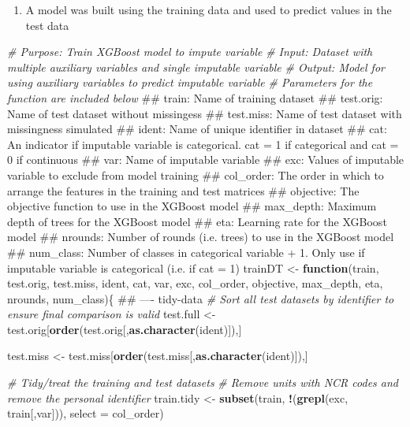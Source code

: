 \documentclass[]{book}
\newenvironment{Shaded}{\begin{snugshade}}{\end{snugshade}}
\newcommand{\KeywordTok}[1]{\textcolor[rgb]{0.13,0.29,0.53}{\textbf{#1}}}
\newcommand{\DataTypeTok}[1]{\textcolor[rgb]{0.13,0.29,0.53}{#1}}
\newcommand{\StringTok}[1]{\textcolor[rgb]{0.31,0.60,0.02}{#1}}
\newcommand{\CommentTok}[1]{\textcolor[rgb]{0.56,0.35,0.01}{\textit{#1}}}
\newcommand{\ControlFlowTok}[1]{\textcolor[rgb]{0.13,0.29,0.53}{\textbf{#1}}}
\newcommand{\OperatorTok}[1]{\textcolor[rgb]{0.81,0.36,0.00}{\textbf{#1}}}
\newcommand{\NormalTok}[1]{#1}
\providecommand{\tightlist}{%
  \setlength{\itemsep}{0pt}\setlength{\parskip}{0pt}}
\begin{document}
\begin{enumerate}
\def\labelenumi{\arabic{enumi})}
\setcounter{enumi}{4}
\tightlist
\item
  A model was built using the training data and used to predict values
  in the test data
\end{enumerate}

\begin{Shaded}
\begin{Highlighting}[]
\CommentTok{# Purpose: Train XGBoost model to impute variable}
\CommentTok{# Input: Dataset with multiple auxiliary variables and single imputable variable }
\CommentTok{# Output: Model for using auxiliary variables to predict imputable variable}
\CommentTok{# Parameters for the function are included below}
\NormalTok{## train: Name of training dataset}
\NormalTok{## test.orig: Name of test dataset without missingess}
\NormalTok{## test.miss: Name of test dataset with missingness simulated}
\NormalTok{## ident: Name of unique identifier in dataset}
\NormalTok{## cat: An indicator if imputable variable is categorical. cat = 1 if categorical and cat = 0 if continuous}
\NormalTok{## var: Name of imputable variable}
\NormalTok{## exc: Values of imputable variable to exclude from model training}
\NormalTok{## col_order: The order in which to arrange the features in the training and test matrices}
\NormalTok{## objective: The objective function to use in the XGBoost model}
\NormalTok{## max_depth: Maximum depth of trees for the XGBoost model}
\NormalTok{## eta: Learning rate for the XGBoost model}
\NormalTok{## nrounds: Number of rounds (i.e. trees) to use in the XGBoost model}
\NormalTok{## num_class: Number of classes in categorical variable + 1. Only use if imputable variable is categorical (i.e. if cat = 1)}
\NormalTok{trainDT <-}\StringTok{ }\ControlFlowTok{function}\NormalTok{(train, test.orig, test.miss, ident, cat, var, exc, col_order,}
\NormalTok{                    objective, max_depth, eta, nrounds, num_class)\{}
\NormalTok{  ## ---- tidy-data}
  \CommentTok{# Sort all test datasets by identifier to ensure final comparison is valid}
\NormalTok{  test.full <-}\StringTok{ }\NormalTok{test.orig[}\KeywordTok{order}\NormalTok{(test.orig[,}\KeywordTok{as.character}\NormalTok{(ident)]),]}
  
\NormalTok{  test.miss <-}\StringTok{ }\NormalTok{test.miss[}\KeywordTok{order}\NormalTok{(test.miss[,}\KeywordTok{as.character}\NormalTok{(ident)]),]}
  
  \CommentTok{# Tidy/treat the training and test datasets}
  \CommentTok{# Remove units with NCR codes and remove the personal identifier}
\NormalTok{  train.tidy <-}\StringTok{ }\KeywordTok{subset}\NormalTok{(train, }\OperatorTok{!}\NormalTok{(}\KeywordTok{grepl}\NormalTok{(exc, train[,var])), }\DataTypeTok{select =}\NormalTok{ col_order)}
  

\end{Highlighting}
\end{Shaded}
\end{document}
